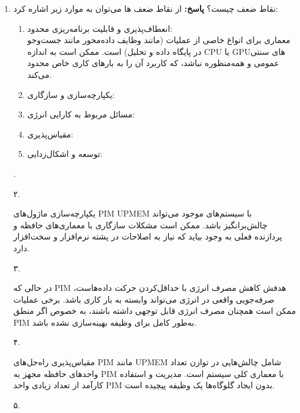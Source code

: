 \documentclass[12pt]{exam}
\begin{document}
\begin{questions}
\begin{enumerate}
	
	
	
	
	\item 
	نقاط ضعف  چیست؟
	\textbf{پاسخ:} از نقاط ضعف  ها می‌توان به موارد زیر اشاره کرد:
	
	
	\begin{enumerate}
		\item انعطاف‌پذیری و قابلیت برنامه‌ریزی محدود:\\
معماری  برای انواع خاصی از عملیات (مانند وظایف داده‌محور مانند جست‌وجو در پایگاه داده و تحلیل) است. ممکن است به اندازه CPU یا GPUهای سنتی عمومی و همه‌منظوره نباشد، که کاربرد آن را به بارهای کاری خاص محدود می‌کند.
		
		
		
		\item یکپارچه‌سازی و سازگاری:\\
		
		
		
		
		\item مسائل مربوط به کارایی انرژی:\\
		
		
		
		\item مقیاس‌پذیری:\\
		
		
		
		
		\item توسعه و اشکال‌زدایی:\\
	\end{enumerate}
	. 
	
	
	
	۲. 
	
	یکپارچه‌سازی ماژول‌های PIM UPMEM با سیستم‌های موجود می‌تواند چالش‌برانگیز باشد. ممکن است مشکلات سازگاری با معماری‌های حافظه و پردازنده فعلی به وجود بیاید که نیاز به اصلاحات در پشته نرم‌افزار و سخت‌افزار دارد.
	
	۳. 
	
	در حالی که PIM هدفش کاهش مصرف انرژی با حداقل‌کردن حرکت داده‌هاست، صرفه‌جویی واقعی در انرژی می‌تواند وابسته به بار کاری باشد. برخی عملیات ممکن است همچنان مصرف انرژی قابل توجهی داشته باشند، به خصوص اگر منطق PIM به‌طور کامل برای وظیفه بهینه‌سازی نشده باشد.
	
	۴. 
	
	مقیاس‌پذیری راه‌حل‌های PIM مانند UPMEM شامل چالش‌هایی در توازن تعداد واحدهای حافظه مجهز به PIM با معماری کلی سیستم است. مدیریت و استفاده کارآمد از تعداد زیادی واحد PIM بدون ایجاد گلوگاه‌ها یک وظیفه پیچیده است.
	
	۵. 
	

\end{enumerate}
\end{questions}
\end{document}
